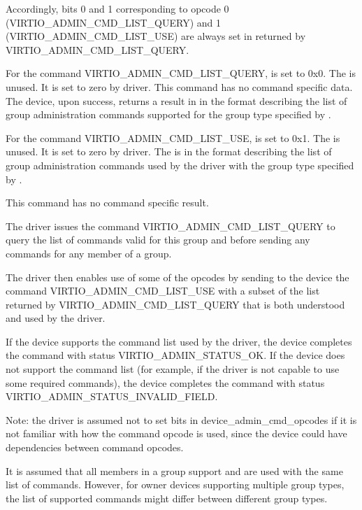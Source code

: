 Accordingly, bits 0 and 1 corresponding to opcode 0
(VIRTIO_ADMIN_CMD_LIST_QUERY) and 1
(VIRTIO_ADMIN_CMD_LIST_USE) are
always set in  returned by VIRTIO_ADMIN_CMD_LIST_QUERY.

For the command VIRTIO_ADMIN_CMD_LIST_QUERY,  is set to 0x0.
The  is unused. It is set to zero by driver.
This command has no command specific data.
The device, upon success, returns a result in
 in the format
 describing the
list of group administration commands supported for the group type
specified by .

For the command VIRTIO_ADMIN_CMD_LIST_USE, 
is set to 0x1.
The  is unused. It is set to zero by driver.
The  is in the format
 describing the
list of group administration commands used by the driver
with the group type specified by .

This command has no command specific result.

The driver issues the command VIRTIO_ADMIN_CMD_LIST_QUERY to
query the list of commands valid for this group and before sending
any commands for any member of a group.

The driver then enables use of some of the opcodes by sending to
the device the command VIRTIO_ADMIN_CMD_LIST_USE with a subset
of the list returned by VIRTIO_ADMIN_CMD_LIST_QUERY that is
both understood and used by the driver.

If the device supports the command list used by the driver, the
device completes the command with status VIRTIO_ADMIN_STATUS_OK.
If the device does not support the command list
(for example, if the driver is not capable to use
some required commands), the device
completes the command with status
VIRTIO_ADMIN_STATUS_INVALID_FIELD.

Note: the driver is assumed not to set bits in
device_admin_cmd_opcodes
if it is not familiar with how the command opcode
is used, since the device could have dependencies between
command opcodes.

It is assumed that all members in a group support and are used
with the same list of commands. However, for owner devices
supporting multiple group types, the list of supported commands
might differ between different group types.




